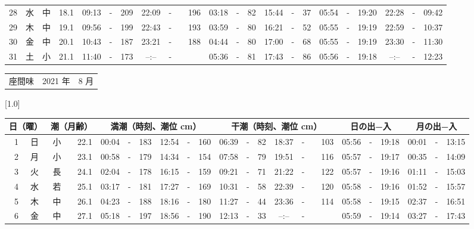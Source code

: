 \documentclass[12pt,a4j]{jsarticle}
\begin{document}
\begin{table}[htbp]
\begin{center}
{\begin{tabular}{|rc|cr|ccrccr|ccrccr|ccc|ccc|}
28 & 水 & 中 & 18.1 &  09:13 &-& 209 &  22:09 &-& 196 &  03:18 &-&  82 &  15:44 &-&  37 & 05:54 & -& 19:20 & 22:28 & -& 09:42 \\
29 & 木 & 中 & 19.1 &  09:56 &-& 199 &  22:43 &-& 193 &  03:59 &-&  80 &  16:21 &-&  52 & 05:55 & -& 19:19 & 22:59 & -& 10:37 \\
30 & 金 & 中 & 20.1 &  10:43 &-& 187 &  23:21 &-& 188 &  04:44 &-&  80 &  17:00 &-&  68 & 05:55 & -& 19:19 & 23:30 & -& 11:30 \\
31 & 土 & 小 & 21.1 &  11:40 &-& 173 &  --:-- &-&~~~~~ &  05:36 &-&  81 &  17:43 &-&  86 & 05:56 & -& 19:18 & --:-- & -& 12:23 \\
   \hline
   \end{tabular}}
   \end{center}
\end{table}
\newpage
 \begin{table}[htbp]
 \begin{center}
 \begin{tabular}{lcc}
 \LARGE{座間味}  & \large{2021 年} & \large{ 8 月} \\
 \end{tabular}
 \end{center}
 \begin{center}
    \scalebox{0.7}[1.0]{
    \begin{tabular}{|rc|cr|ccrccr|ccrccr|ccc|ccc|}
    \hline
    \multicolumn{2}{|c|}{日（曜）} & \multicolumn{2}{c|}{潮（月齢）} & \multicolumn{6}{c|}{満潮（時刻、潮位 cm）} & \multicolumn{6}{c|}{干潮（時刻、潮位 cm）} & \multicolumn{3}{c|}{日の出−入} &  \multicolumn{3}{c|}{月の出−入}\\
 \hline
 1 & 日 & 小 & 22.1 &  00:04 &-& 183 &  12:54 &-& 160 &  06:39 &-&  82 &  18:37 &-& 103 & 05:56 & -& 19:18 & 00:01 & -& 13:15 \\
 2 & 月 & 小 & 23.1 &  00:58 &-& 179 &  14:34 &-& 154 &  07:58 &-&  79 &  19:51 &-& 116 & 05:57 & -& 19:17 & 00:35 & -& 14:09 \\
 3 & 火 & 長 & 24.1 &  02:04 &-& 178 &  16:15 &-& 159 &  09:21 &-&  71 &  21:22 &-& 122 & 05:57 & -& 19:16 & 01:11 & -& 15:03 \\
 4 & 水 & 若 & 25.1 &  03:17 &-& 181 &  17:27 &-& 169 &  10:31 &-&  58 &  22:39 &-& 120 & 05:58 & -& 19:16 & 01:52 & -& 15:57 \\
 5 & 木 & 中 & 26.1 &  04:23 &-& 188 &  18:16 &-& 180 &  11:27 &-&  44 &  23:36 &-& 114 & 05:58 & -& 19:15 & 02:37 & -& 16:51 \\
 6 & 金 & 中 & 27.1 &  05:18 &-& 197 &  18:56 &-& 190 &  12:13 &-&  33 &  --:-- &-&~~~~~ & 05:59 & -& 19:14 & 03:27 & -& 17:43 \\

\end{tabular}}
\end{center}
\end{table}
\end{document}

